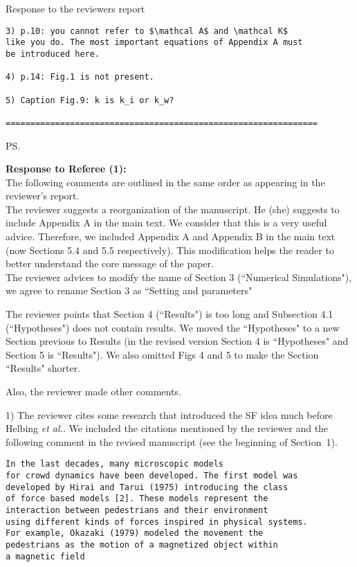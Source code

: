 \documentclass[a4paper,12pt]{letter}
\begin{document}
\begin{letter}{Response to the reviewers report}
\begin{verbatim}
3) p.10: you cannot refer to $\mathcal A$ and \mathcal K$ 
like you do. The most important equations of Appendix A must 
be introduced here.

4) p.14: Fig.1 is not present.

5) Caption Fig.9: k is k_i or k_w?

===============================================================
\end{verbatim}


\ps{\textbf{Response to Referee (1):}
\\ 

The following comments are outlined in the same order as appearing in the
reviewer’s report. \\

The reviewer suggests a reorganization of the manuscript. He (she) suggests to include Appendix A in the main text.
We consider that this is a very useful advice. Therefore, we included Appendix A and Appendix B in the main text (now Sections 5.4 and 5.5 respectively). 
This modification helps the reader to better understand the core message of the paper. \\ 

The reviewer advices to modify the name of Section 3 (``Numerical Simulations"), we agree to rename 
Section 3 as ``Setting and parameters"

The reviewer points that Section 4 (``Results") is too long and Subsection 4.1 (``Hypotheses")
does not contain results.  We moved the ``Hypotheses" to a new Section previous to Results 
(in the revised version Section 4 is ``Hypotheses" and Section 5 is ``Results"). We also omitted Figs 4 and 5 to make
the Section ``Results" shorter. 

Also, the reviewer made other comments.

1) The reviewer cites some research that introduced the SF idea much before 
Helbing \textit{et al.}. We included the citations mentioned by the reviewer 
and the following comment in the revised manuscript (see the beginning of Section~1). 

\begin{verbatim}
In the last decades, many microscopic models 
for crowd dynamics have been developed. The first model was
developed by Hirai and Tarui (1975) introducing the class
of force based models [2]. These models represent the
interaction between pedestrians and their environment 
using different kinds of forces inspired in physical systems.
For example, Okazaki (1979) modeled the movement the
pedestrians as the motion of a magnetized object within
a magnetic field
\end{verbatim}

}
\end{letter}
\end{document}
